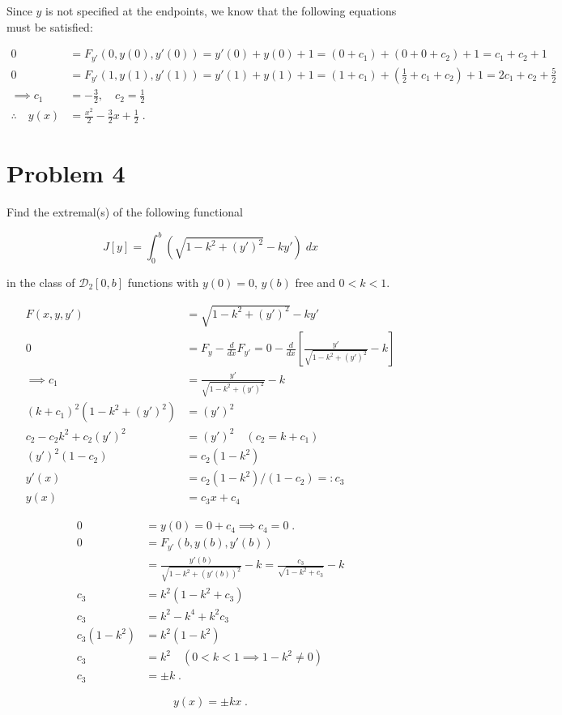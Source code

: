 \documentclass[a4paper]{article}
\begin{document}
Since $y$ is not specified at the endpoints, we know that the following equations must be satisfied:


\begin{align*}
0 &= F_{y'}(0,y(0),y'(0)) =  y'(0) + y(0) + 1 = (0+c_1) + (0 + 0 + c_2) + 1 = c_1 + c_2 + 1\\
0 &= F_{y'}(1,y(1),y'(1)) = y'(1) + y(1) + 1 = (1+c_1) + (\frac{1}{2} + c_1 + c_2) + 1 = 2c_1 +c_2 + \frac{5}{2}\\
\implies c_1 &= -\frac{3}{2}, \quad c_2 = \frac{1}{2} \\
\therefore \quad y(x) &= \frac{x^2}{2} - \frac{3}{2}x + \frac{1}{2} \;.
\end{align*}


\section*{Problem 4}

Find the extremal(s) of the following functional

$$J[y] = \int_0^b \left(\sqrt{1- k^2 + (y')^2} - ky' \right) \; dx $$

in the class of $\mathcal{D}_2[0,b]$ functions with $y(0) = 0$, $y(b)$ free and $0<k<1$. 

\begin{align*}
F(x,y,y') &= \sqrt{1- k^2 + (y')^2} - ky' \\
0 &= F_y - \frac{d}{dx}F_{y'} = 0 - \frac{d}{dx}\left[ \frac{y'}{\sqrt{1 - k^2 +(y')^2}} - k \right]\\
\implies c_1 &= \frac{y'}{\sqrt{1 - k^2 +(y')^2}} - k \\
(k+c_1)^2(1- k^2 + (y')^2) &= (y')^2 \\
c_2 - c_2k^2 + c_2(y')^2 &= (y')^2 \quad (c_2 = k+c_1) \\
(y')^2(1-c_2) &= c_2(1-k^2) \\
y'(x) &= c_2(1-k^2) / (1-c_2) =: c_3 \\
y(x) &= c_3x + c_4
\end{align*}

\begin{align*}
0 &= y(0) = 0 + c_4 \implies c_4 = 0 \;. \\
0 &= F_{y'}(b,y(b),y'(b))\\
& = \frac{y'(b)}{\sqrt{1-k^2 + (y'(b))^2}} - k = \frac{c_3}{\sqrt{1-k^2 + c_3}} - k \\
c_3 &=k^2(1-k^2 + c_3) \\
c_3 &= k^2 - k^4 + k^2c_3\\
c_3(1-k^2) &= k^2(1-k^2) \\
c_3 &= k^2 \quad (0<k<1 \implies 1-k^2 \neq 0) \\
c_3 &= \pm k \;.
\end{align*} 

$$y(x) = \pm kx \;.$$
\end{document}
